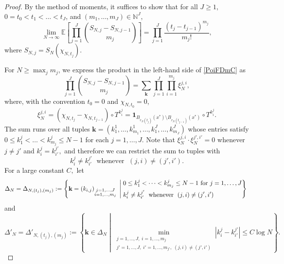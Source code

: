 \documentclass[11pt,twoside,a4paper,reqno]{amsart}
\def\one{{\mathbf{1}}}
\begin{document}
\begin{proof}
By the method of moments, it suffices to show that for all $J\geq 1$, $0=t_0<t_1<\dots<t_J$, and $(m_1,\dots,m_J) \in \mathbb{N}^J$,
\begin{equation}\label{PoiFDmC}
\lim_{N \to \infty} \mathbb{E}\left[ \prod_{j=1}^J \binom{S_{N,j} - S_{N,j-1}}{m_j} \right] = \prod_{j=1}^J \frac{(t_j - t_{j-1})^{m_j}}{m_j!},
\end{equation}
where $S_{N,j} =S_N(\chi_{N,t_j})$.

For $N \geq \max_j m_j$, we express the product in the left-hand side of \eqref{PoiFDmC} as
\begin{equation}\label{slbinomprod}
\prod_{j=1}^J \binom{S_{N,j} - S_{N,j-1}}{m_j} = \sum_{\mathbf{k}} \prod_{j=1}^J \prod_{i=1}^{m_j} \xi_N^{j,i},
\end{equation}
where, with the convention $t_0=0$ and $\chi_{N,t_0}=0$,
\begin{equation*}
\xi_N^{j,i}=\left(\chi_{N,t_j}-\chi_{N,t_{j-1}}\right)\circ T^{k_i^j}=\one_{
B_{r_N(t_j)}(x^*)\setminus B_{r_N(t_{j-1})}(x^*)}\circ T^{k_i^j}.
\end{equation*}
The sum runs over all tuples $\mathbf{k} = (k_1^1, \dots, k_{m_1}^1, \dots, k_1^J, \dots, k_{m_J}^J)$ whose entries satisfy $0 \leq k_1^j < \dots < k_{m_j}^j \leq N-1$ for each $j=1,\dots,J$. Note that
$\xi_N^{j,i}\cdot\xi_N^{j',i'}=0$ whenever $j\not=j'$ and $k_i^j=k_{i'}^{j'},$ and therefore we can restrict the sum to tuples with
\begin{equation*}
k^j_i \neq k^{j'}_{i'} \;\text{ whenever }\; (j,i)\neq (j',i').
\end{equation*}
For a large constant $C,$ let
\begin{equation*}
\Delta_N=\Delta_{N,(t_j),(m_j)}:=\left\{\mathbf{k}=(k_{i,j})_{\substack{j=1,\ldots,J\\i=1,\ldots,m_j}} \;\left|\;
\begin{aligned}
&0\leq k^j_{1} < \dots < k^j_{m_j} \leq N-1\text{ for } j=1,\ldots,J\\
&k^j_i \neq k^{j'}_{i'} \;\text{ whenever }\; (j,i)\neq (j',i')
\end{aligned}
\right\}\right. \\
\end{equation*}
and
\begin{equation*}
\Delta'_N=\Delta'_{N,(t_j),(m_j)}:=\left\{\mathbf{k}\in \Delta_N \;\left|\;\min_{\substack{j=1,\ldots,J, \; i=1,\ldots, m_j\\ j'=1,\ldots,J, \; i'=1,\ldots, m_{j'},\; (j,i)\not=(j',i')}} |k^j_i-k^{j'}_{i'}|\leq C \log N\right\}\right. .
\end{equation*}










\end{proof}
\end{document}
